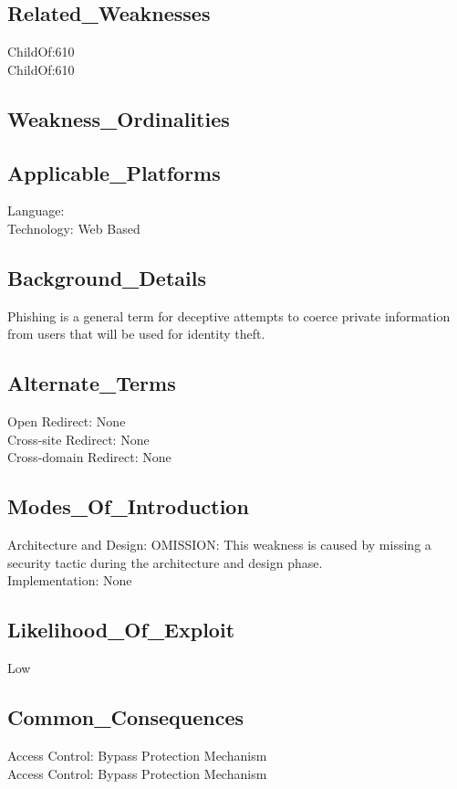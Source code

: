 \subsection*{Related\_Weaknesses}
ChildOf:610\\
ChildOf:610\\
\subsection*{Weakness\_Ordinalities}
\subsection*{Applicable\_Platforms}
Language: \\
Technology: Web Based\\
\subsection*{Background\_Details}
Phishing is a general term for deceptive attempts to coerce private information from users that will be used for identity theft.\\
\subsection*{Alternate\_Terms}
Open Redirect: None\\
Cross-site Redirect: None\\
Cross-domain Redirect: None\\
\subsection*{Modes\_Of\_Introduction}
Architecture and Design: OMISSION: This weakness is caused by missing a security tactic during the architecture and design phase.\\
Implementation: None\\
\subsection*{Likelihood\_Of\_Exploit}
Low

\subsection*{Common\_Consequences}
Access Control: Bypass Protection Mechanism\\
Access Control: Bypass Protection Mechanism\\
